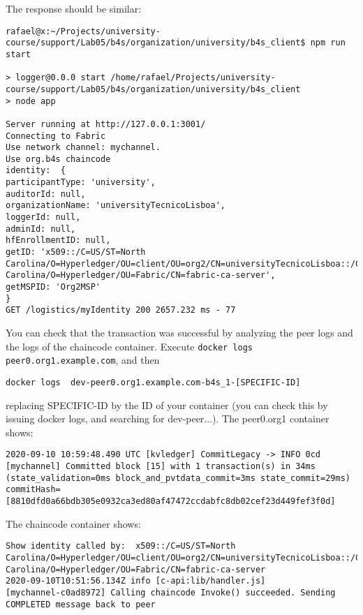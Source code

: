 \documentclass[12pt,a4paper]{article}
\theoremstyle{definition}
\begin{document}
The response should be similar:
\begin{verbatim}
rafael@x:~/Projects/university-course/support/Lab05/b4s/organization/university/b4s_client$ npm run start

> logger@0.0.0 start /home/rafael/Projects/university-course/support/Lab05/b4s/organization/university/b4s_client
> node app

Server running at http://127.0.0.1:3001/
Connecting to Fabric
Use network channel: mychannel.
Use org.b4s chaincode
identity:  {
participantType: 'university',
auditorId: null,
organizationName: 'universityTecnicoLisboa',
loggerId: null,
adminId: null,
hfEnrollmentID: null,
getID: 'x509::/C=US/ST=North Carolina/O=Hyperledger/OU=client/OU=org2/CN=universityTecnicoLisboa::/C=US/ST=North Carolina/O=Hyperledger/OU=Fabric/CN=fabric-ca-server',
getMSPID: 'Org2MSP'
}
GET /logistics/myIdentity 200 2657.232 ms - 77

\end{verbatim}

You can check that the transaction was successful by analyzing the peer logs and the logs of the chaincode container. Execute \texttt{docker logs peer0.org1.example.com}, and then

\begin{verbatim}
docker logs  dev-peer0.org1.example.com-b4s_1-[SPECIFIC-ID]
\end{verbatim}

replacing SPECIFIC-ID by the ID of your container (you can check this by issuing docker logs, and searching for dev-peer...).
The peer0.org1 container shows:
\begin{verbatim}
2020-09-10 10:59:48.490 UTC [kvledger] CommitLegacy -> INFO 0cd [mychannel] Committed block [15] with 1 transaction(s) in 34ms (state_validation=0ms block_and_pvtdata_commit=3ms state_commit=29ms) commitHash=[8810dfd0a66bdb305e0932ca3ed80af47472ccdabfc8db02cef23d449fef3f0d]
\end{verbatim}




The chaincode container shows:
\begin{verbatim}
Show identity called by:  x509::/C=US/ST=North Carolina/O=Hyperledger/OU=client/OU=org2/CN=universityTecnicoLisboa::/C=US/ST=North Carolina/O=Hyperledger/OU=Fabric/CN=fabric-ca-server
2020-09-10T10:51:56.134Z info [c-api:lib/handler.js]                              [mychannel-c0ad8972] Calling chaincode Invoke() succeeded. Sending COMPLETED message back to peer
\end{verbatim}
\end{document}
